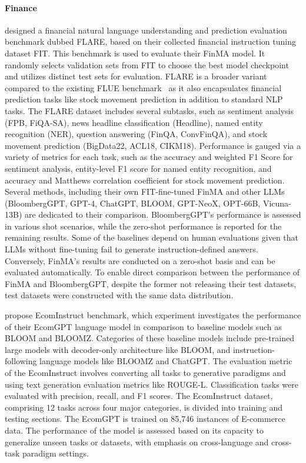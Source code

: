 {\paragraph{Finance}}
\citet{xie2023pixiu} designed a financial natural language understanding and prediction evaluation benchmark dubbed FLARE, based on their collected financial instruction tuning dataset FIT. This benchmark is used to evaluate their FinMA model. It randomly selects validation sets from FIT to choose the best model checkpoint and utilizes distinct test sets for evaluation.
FLARE is a broader variant compared to the existing FLUE benchmark~\cite{shah2022flue} as it also encapsulates financial prediction tasks like stock movement prediction in addition to standard NLP tasks. 
The FLARE dataset includes several subtasks, such as sentiment analysis (FPB, FiQA-SA), news headline  classification (Headline), named entity recognition (NER), question answering (FinQA, ConvFinQA), and stock movement prediction (BigData22, ACL18, CIKM18).
Performance is gauged via a variety of metrics for each task, such as the accuracy and weighted F1 Score for sentiment analysis, entity-level F1 score for named entity recognition, and accuracy and Matthews correlation coefficient for stock movement prediction.
Several methods, including their own FIT-fine-tuned FinMA and other LLMs (BloombergGPT, GPT-4, ChatGPT, BLOOM, GPT-NeoX, OPT-66B, Vicuna-13B) are dedicated to their comparison. BloombergGPT's performance is assessed in various shot scenarios, while the zero-shot performance is reported for the remaining results. Some of the baselines depend on human evaluations given that LLMs without fine-tuning fail to generate instruction-defined answers. Conversely, FinMA's results are conducted on a zero-shot basis and can be evaluated automatically. 
To enable direct comparison between the performance of FinMA and BloombergGPT, despite the former not releasing their test datasets, test datasets were constructed with the same data distribution.

\citet{li2023ecomgpt} propose EcomInstruct benchmark, which experiment investigates the performance of their EcomGPT language model in comparison to baseline models such as BLOOM and BLOOMZ. Categories of these baseline models include pre-trained large models with decoder-only architecture like BLOOM, and instruction-following language models like BLOOMZ and ChatGPT. The evaluation metric of the EcomInstruct involves converting all tasks to generative paradigms and using text generation evaluation metrics like ROUGE-L. Classification tasks were evaluated with precision, recall, and F1 scores. The EcomInstruct dataset, comprising 12 tasks across four major categories, is divided into training and testing sections. The EcomGPT is trained on 85,746 instances of E-commerce data. The performance of the model is assessed based on its capacity to generalize unseen tasks or datasets, with emphasis on cross-language and cross-task paradigm settings.


